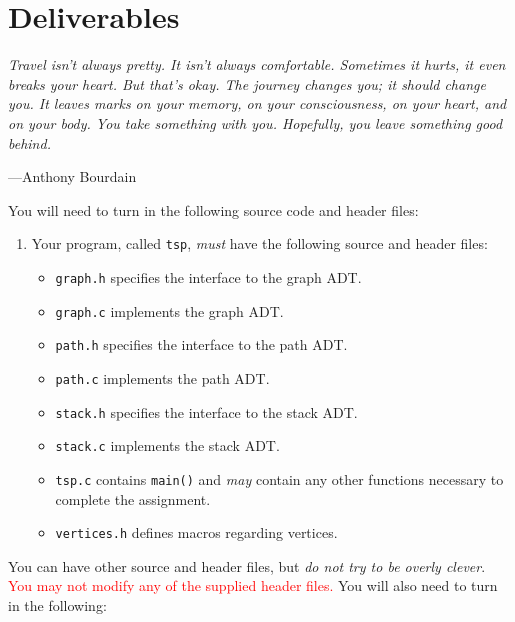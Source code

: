 \section{Deliverables}

\textwidth
\epigraph{\emph{Travel isn't always pretty. It isn't always comfortable.
Sometimes it hurts, it even breaks your heart. But that's okay. The
journey changes you; it should change you. It leaves marks on your
memory, on your consciousness, on your heart, and on your body. You take
something with you. Hopefully, you leave something good
behind.}}{---Anthony Bourdain }

\noindent You will need to turn in the following source code and header files:

\begin{enumerate}
  \item Your program, called \texttt{tsp}, \emph{must} have the
    following source and header files:
  \begin{itemize}
    \item \texttt{graph.h} specifies the interface to the graph ADT.
    \item \texttt{graph.c} implements the graph ADT.
    \item \texttt{path.h} specifies the interface to the path ADT.
    \item \texttt{path.c} implements the path ADT.
    \item \texttt{stack.h} specifies the interface to the stack ADT.
    \item \texttt{stack.c} implements the stack ADT.
    \item \texttt{tsp.c} contains \texttt{main()} and \emph{may} contain
      any other functions necessary to complete the assignment.
    \item \texttt{vertices.h} defines macros regarding vertices.
  \end{itemize}
\end{enumerate}

You can have other source and header files, but \emph{do not try to be
overly clever}. \textcolor{red}{You may not modify any of the supplied
header files.} You will also need to turn in the following:

